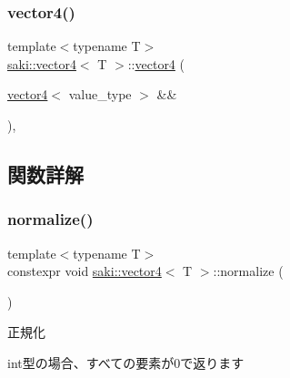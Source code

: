\mbox{\label{classsaki_1_1vector4_ab122c461e9e6e775f981d6c197c43fe1}} 
\subsubsection{\texorpdfstring{vector4()}{vector4()}\hspace{0.1cm}{\footnotesize\ttfamily [5/5]}}
{\footnotesize\ttfamily template$<$typename T$>$ \\
\mbox{\hyperlink{classsaki_1_1vector4}{saki\+::vector4}}$<$ T $>$\+::\mbox{\hyperlink{classsaki_1_1vector4}{vector4}} (\begin{DoxyParamCaption}\item[{\mbox{\hyperlink{classsaki_1_1vector4}{vector4}}$<$ value\+\_\+type $>$ \&\&}]{ }\end{DoxyParamCaption})\hspace{0.3cm}{\ttfamily [default]}, {\ttfamily [noexcept]}}



\subsection{関数詳解}
\mbox{\label{classsaki_1_1vector4_a559bf8b322a0949cfe985ec82e32b2f4}} 
\subsubsection{\texorpdfstring{normalize()}{normalize()}}
{\footnotesize\ttfamily template$<$typename T$>$ \\
constexpr void \mbox{\hyperlink{classsaki_1_1vector4}{saki\+::vector4}}$<$ T $>$\+::normalize (\begin{DoxyParamCaption}{ }\end{DoxyParamCaption})\hspace{0.3cm}{\ttfamily [inline]}}



正規化 

int型の場合、すべての要素が0で返ります \mbox{\label{classsaki_1_1vector4_a49e953fdbce76c145389e6f2f7b09da0}} 
